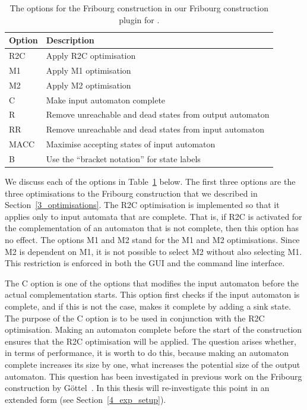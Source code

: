 \begin{table}[htb]
\centering
\begin{tabular}{ll}
\hline
Option & Description \\
\hline
R2C  & Apply R2C optimisation \\
M1   & Apply M1 optimisation \\
M2   & Apply M2 optimisation  \\
C    & Make input automaton complete \\
R    & Remove unreachable and dead states from output automaton \\
RR   & Remove unreachable and dead states from input automaton \\
MACC & Maximise accepting states of input automaton \\
B    & Use the ``bracket notation'' for state labels \\
\hline
\end{tabular}
\caption{The options for the Fribourg construction in our Fribourg construction plugin for \goal.}
\label{goal_options}
\end{table}

We discuss each of the options in Table~\ref{goal_options} below. The first three options are the three optimisations to the Fribourg construction that we described in Section~\ref{3_optimisations}. The R2C optimisation is implemented so that it applies only to input automata that are complete. That is, if R2C is activated for the complementation of an automaton that is not complete, then this option has no effect. The options M1 and M2 stand for the M1 and M2 optimisations. Since M2 is dependent on M1, it is not possible to select M2 without also selecting M1. This restriction is enforced in both the GUI and the command line interface.

The C option is one of the options that modifies the input automaton before the actual complementation starts. This option first checks if the input automaton is complete, and if this is not the case, makes it complete by adding a sink state. The purpose of the C option is to be used in conjunction with the R2C optimisation. Making an automaton complete before the start of the construction ensures that the R2C optimisation will be applied. The question arises whether, in terms of performance, it is worth to do this, because making an automaton complete increases its size by one, what increases the potential size of the output automaton. This question has been investigated in previous work on the Fribourg construction by Göttel~\cite{2013_bsc_goettel}. In this thesis will re-investigate this point in an extended form (see Section~\ref{4_exp_setup}).

